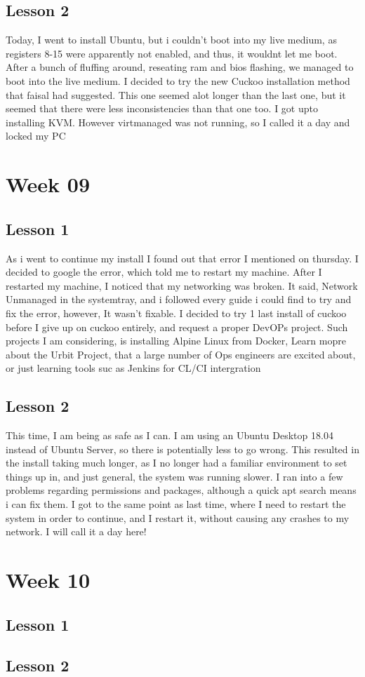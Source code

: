 \documentclass{article}
\begin{document}
\subsection{Lesson 2}
Today, I went to install Ubuntu, but i couldn't boot into my live medium, as registers 8-15 were apparently not enabled, and thus, it wouldnt let me boot. After a bunch of fluffing around, reseating ram and bios flashing, we managed to boot into the live medium. I decided to try the new Cuckoo installation method that faisal had suggested. This one seemed alot longer than the last one, but it seemed that there were less inconsistencies than that one too. I got upto installing KVM. However virtmanaged was not running, so I called it a day and locked my PC 

\section{Week 09}
\subsection{Lesson 1}
As i went to continue my install I found out that error I mentioned on thursday. I decided to google the error, which told me to restart my machine. After I restarted my machine, I noticed that my networking was broken. It said, Network Unmanaged in the systemtray, and i followed every guide i could find to try and fix the error, however, It wasn't fixable. I decided to try 1 last install of cuckoo before I give up on cuckoo entirely, and request a proper DevOPs project. Such projects I am considering, is installing Alpine Linux from Docker, Learn mopre about the Urbit Project, that a large number of Ops engineers are excited about, or just learning tools suc as Jenkins for CL/CI intergration  
\subsection{Lesson 2}
This time, I am being as safe as I can. I am using an Ubuntu Desktop 18.04 instead of Ubuntu Server, so there is potentially less to go wrong. This resulted in the install taking much longer, as I no longer had a familiar environment to set things up in, and just general, the system was running slower. I ran into a few problems regarding permissions and packages, although a quick apt search means i can fix them. I got to the same point as last time, where I need to restart the system in order to continue, and I restart it, without causing any crashes to my network. I will call it a day here!
\section{Week 10}
\subsection{Lesson 1}
\subsection{Lesson 2}
\end{document}
